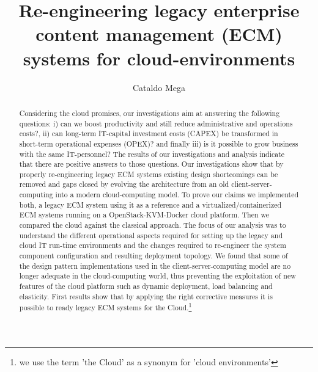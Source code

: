 \documentclass[EPiC]{easychair} %
\title{Re-engineering legacy enterprise content management (ECM) systems for cloud-environments
    }
\author{ Cataldo Mega\inst{1}
}
\institute{ 
	University of Stuttgart, Stuttgart, IPVS, Germany\\
	\email{cataldo.mega@ipvs.uni-stuttgart.de}
}
\begin{document}
\maketitle

\begin{abstract}
  Considering the cloud promises, our investigations aim at answering the following questions: i) can we boost productivity and still reduce administrative and operations costs?, ii) can long-term IT-capital investment costs (CAPEX) be transformed in short-term operational expenses (OPEX)? and finally iii) is it possible to grow business with the same IT-personnel? The results of our investigations and analysis indicate that there are positive answers to those questions.
  Our investigations show that by properly re-engineering legacy ECM systems existing design shortcomings can be removed and gaps closed by evolving the architecture from an old client-server-computing into a modern cloud-computing model. To prove our claims we implemented both, a legacy ECM system using it as a reference and a virtualized/containerized ECM systems running on a OpenStack-KVM-Docker cloud platform. Then we compared the cloud against the classical approach. The focus of our analysis was to understand the different operational aspects required for setting up the legacy and cloud IT run-time environments and the changes required to re-engineer the system component configuration and resulting deployment topology. We found that some of the design pattern implementations used in the client-server-computing model are no longer adequate in the cloud-computing world, thus preventing the exploitation of new features of the cloud platform such as dynamic deployment, load balancing and elasticity. First results show that by applying the right corrective measures it is possible to ready legacy ECM systems for the Cloud.\footnote{we use the term 'the Cloud' as a synonym for 'cloud environments'}
 \end{abstract}
 
\end{document}
